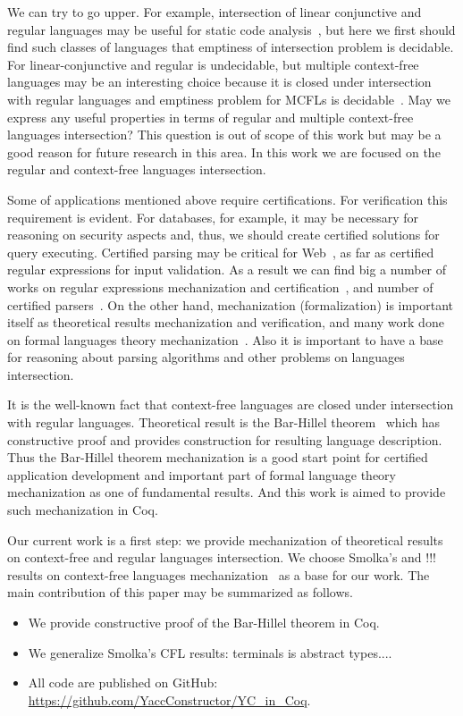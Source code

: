 We can try to go upper.
For example, intersection of linear conjunctive and regular languages may be useful for static code analysis~\cite{zhang2017context}, but here we first should find such classes of languages that emptiness of intersection problem is decidable.
For linear-conjunctive and regular is undecidable, but multiple context-free languages may be an interesting choice because it is closed under intersection with regular languages and emptiness problem for MCFLs is decidable~\cite{!!!}.
May we express any useful properties in terms of regular and multiple context-free languages intersection? 
This question is out of scope of this work but may be a good reason for future research in this area.
In this work we are focused on the regular and context-free languages intersection.

Some of applications mentioned above require certifications. 
For verification this requirement is evident.
For databases, for example, it may be necessary for reasoning on security aspects and, thus, we should create certified solutions for query executing.
Certified parsing may be critical for Web~\cite{!!!}, as far as certified regular expressions for input validation.
As a result we can find big a number of works on regular expressions mechanization and certification~\cite{!!!}, and number of certified parsers~\cite{!!!}.
On the other hand, mechanization (formalization) is important itself as theoretical results mechanization and verification, and many work done on formal languages theory mechanization~\cite{!!!}. 
Also it is important to have a base for reasoning about parsing algorithms and other problems on languages intersection.

It is the well-known fact that context-free languages are closed under intersection with regular languages. 
Theoretical result is the Bar-Hillel theorem~\cite{bar1961formal} which has constructive proof and provides construction for resulting language description.
Thus the Bar-Hillel theorem mechanization is a good start point for certified application development and important part of formal language theory mechanization as one of fundamental results.
And this work is aimed to provide such mechanization in Coq.

Our current work is a first step: we provide mechanization of theoretical results on context-free and regular languages intersection.
We choose Smolka's and !!! results on context-free languages mechanization~\cite{!!!} as a base for our work.
The main contribution of this paper may be summarized as follows.
\begin{itemize}
\item We provide constructive proof of the Bar-Hillel theorem in Coq.
\item We generalize Smolka's CFL results: terminals is abstract types....
\item All code are published on GitHub: \url{https://github.com/YaccConstructor/YC_in_Coq}.
\end{itemize}

